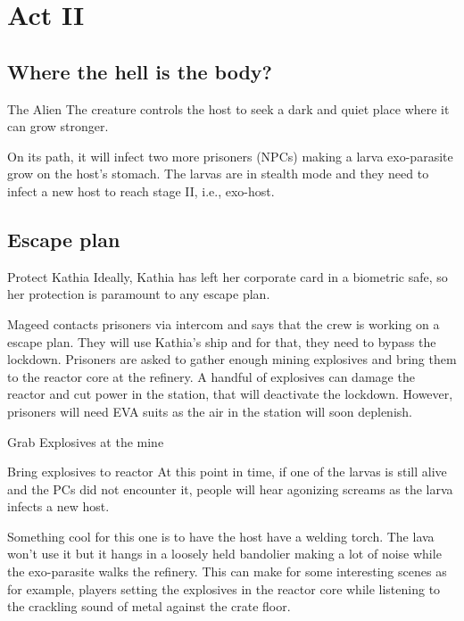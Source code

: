 \chapter{Act II}




\section{Where the hell is the body?}


\begin{rpg-commentbox}{The Alien}
   The creature controls the host to seek a dark and quiet place where it can grow stronger.

    On its path, it will infect two more prisoners (NPCs) making a larva exo-parasite grow on the host's stomach. 
    The larvas are in stealth mode and they need to infect a new host to reach stage II, i.e., exo-host.
\end{rpg-commentbox}


\newsect

\section{Escape plan}


\begin{rpg-commentbox}{Protect Kathia}
    Ideally, Kathia has left her corporate card in a biometric safe, so her protection is paramount to any escape plan.

    Mageed contacts prisoners via intercom and says that the crew is working on a escape plan. They will use Kathia's ship and for that, they need to bypass the lockdown.
    Prisoners are asked to gather enough mining explosives and bring them to the reactor core at the refinery. A handful of explosives can damage the reactor and cut power in the station, that will deactivate the lockdown. However, prisoners will need EVA suits as the air in the station will soon deplenish.
 \end{rpg-commentbox}


 \begin{rpg-commentbox}{Grab Explosives at the mine}
    
 \end{rpg-commentbox}


 
 \begin{rpg-commentbox}{Bring explosives to reactor}
    At this point in time, if one of the larvas is still alive and the PCs did not encounter it, people will hear agonizing screams as the larva infects a new host. 

    Something cool for this one is to have the host have a welding torch. The lava won't use it but it hangs in a loosely held bandolier making a lot of noise while the exo-parasite walks the refinery. This can make for some interesting scenes as for example, players setting the explosives in the reactor core while listening to the crackling sound of metal against the crate floor.
 \end{rpg-commentbox}

